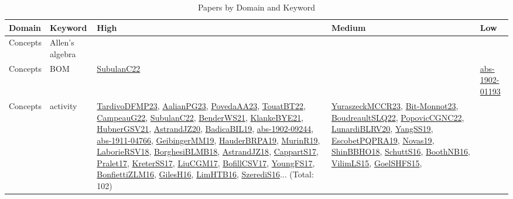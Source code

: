 {\scriptsize
\begin{longtable}{lp{3cm}>{\raggedright}p{6cm}>{\raggedright}p{6cm}p{8cm}}
\caption{Papers by Domain and Keyword}\\ \toprule
Domain & Keyword & High & Medium & Low\\ \midrule\endhead
\bottomrule
\endfoot
Concepts & Allen's algebra &  &  & \\
Concepts & BOM & \href{articles/SubulanC22.pdf}{SubulanC22}\cite{SubulanC22} &  & \href{articles/abs-1902-01193.pdf}{abs-1902-01193}\cite{abs-1902-01193}\\
Concepts & activity & \href{papers/TardivoDFMP23.pdf}{TardivoDFMP23}\cite{TardivoDFMP23}, \href{papers/AalianPG23.pdf}{AalianPG23}\cite{AalianPG23}, \href{papers/PovedaAA23.pdf}{PovedaAA23}\cite{PovedaAA23}, \href{papers/TouatBT22.pdf}{TouatBT22}\cite{TouatBT22}, \href{articles/CampeauG22.pdf}{CampeauG22}\cite{CampeauG22}, \href{articles/SubulanC22.pdf}{SubulanC22}\cite{SubulanC22}, \href{papers/BenderWS21.pdf}{BenderWS21}\cite{BenderWS21}, \href{papers/KlankeBYE21.pdf}{KlankeBYE21}\cite{KlankeBYE21}, \href{articles/HubnerGSV21.pdf}{HubnerGSV21}\cite{HubnerGSV21}, \href{articles/AstrandJZ20.pdf}{AstrandJZ20}\cite{AstrandJZ20}, \href{papers/BadicaBIL19.pdf}{BadicaBIL19}\cite{BadicaBIL19}, \href{articles/abs-1902-09244.pdf}{abs-1902-09244}\cite{abs-1902-09244}, \href{articles/abs-1911-04766.pdf}{abs-1911-04766}\cite{abs-1911-04766}, \href{papers/GeibingerMM19.pdf}{GeibingerMM19}\cite{GeibingerMM19}, \href{articles/HauderBRPA19.pdf}{HauderBRPA19}\cite{HauderBRPA19}, \href{papers/MurinR19.pdf}{MurinR19}\cite{MurinR19}, \href{articles/LaborieRSV18.pdf}{LaborieRSV18}\cite{LaborieRSV18}, \href{articles/BorghesiBLMB18.pdf}{BorghesiBLMB18}\cite{BorghesiBLMB18}, \href{papers/AstrandJZ18.pdf}{AstrandJZ18}\cite{AstrandJZ18}, \href{papers/CappartS17.pdf}{CappartS17}\cite{CappartS17}, \href{papers/Pralet17.pdf}{Pralet17}\cite{Pralet17}, \href{articles/KreterSS17.pdf}{KreterSS17}\cite{KreterSS17}, \href{papers/LiuCGM17.pdf}{LiuCGM17}\cite{LiuCGM17}, \href{papers/BofillCSV17.pdf}{BofillCSV17}\cite{BofillCSV17}, \href{papers/YoungFS17.pdf}{YoungFS17}\cite{YoungFS17}, \href{papers/BonfiettiZLM16.pdf}{BonfiettiZLM16}\cite{BonfiettiZLM16}, \href{papers/GilesH16.pdf}{GilesH16}\cite{GilesH16}, \href{papers/LimHTB16.pdf}{LimHTB16}\cite{LimHTB16}, \href{papers/SzerediS16.pdf}{SzerediS16}\cite{SzerediS16}... (Total: 102) & \href{articles/YuraszeckMCCR23.pdf}{YuraszeckMCCR23}\cite{YuraszeckMCCR23}, \href{papers/Bit-Monnot23.pdf}{Bit-Monnot23}\cite{Bit-Monnot23}, \href{papers/BoudreaultSLQ22.pdf}{BoudreaultSLQ22}\cite{BoudreaultSLQ22}, \href{papers/PopovicCGNC22.pdf}{PopovicCGNC22}\cite{PopovicCGNC22}, \href{articles/LunardiBLRV20.pdf}{LunardiBLRV20}\cite{LunardiBLRV20}, \href{papers/YangSS19.pdf}{YangSS19}\cite{YangSS19}, \href{articles/EscobetPQPRA19.pdf}{EscobetPQPRA19}\cite{EscobetPQPRA19}, \href{articles/Novas19.pdf}{Novas19}\cite{Novas19}, \href{articles/ShinBBHO18.pdf}{ShinBBHO18}\cite{ShinBBHO18}, \href{papers/SchuttS16.pdf}{SchuttS16}\cite{SchuttS16}, \href{papers/BoothNB16.pdf}{BoothNB16}\cite{BoothNB16}, \href{papers/VilimLS15.pdf}{VilimLS15}\cite{VilimLS15}, \href{articles/GoelSHFS15.pdf}{GoelSHFS15}\cite{GoelSHFS15}, 
\end{longtable}}
